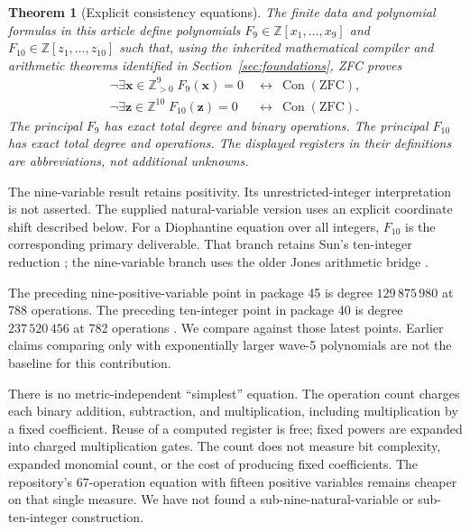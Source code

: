 \documentclass[11pt]{article}
\newcommand{\Z}{\mathbb Z}
\newcommand{\Pos}{\mathbb Z_{>0}}
\newcommand{\Con}{\operatorname{Con}}
\newtheorem{theorem}{Theorem}[section]
\theoremstyle{definition}\newtheorem{definition}[theorem]{Definition}
\theoremstyle{remark}\newtheorem{remark}[theorem]{Remark}
\begin{document}
\begin{theorem}[Explicit consistency equations]
The finite data and polynomial formulas in this article define polynomials
$F_9\in\Z[x_1,\ldots,x_9]$ and $F_{10}\in\Z[z_1,\ldots,z_{10}]$ such that,
using the inherited mathematical compiler and arithmetic theorems identified
in Section~\ref{sec:foundations}, ZFC proves
\begin{align*}
 \neg\exists\mathbf x\in\Pos^9\;F_9(\mathbf x)=0
 &\ \longleftrightarrow\ \Con(\mathrm{ZFC}),\\
 \neg\exists\mathbf z\in\Z^{10}\;F_{10}(\mathbf z)=0
 &\ \longleftrightarrow\ \Con(\mathrm{ZFC}).
\end{align*}
The principal $F_9$ has exact total degree \NineBestDegree{} and
\NineBestOps{} binary operations. The principal $F_{10}$ has exact total
degree \TenBestDegree{} and \TenBestOps{} operations. The displayed
registers in their definitions are abbreviations, not additional unknowns.
\end{theorem}



The nine-variable result retains positivity. Its unrestricted-integer
interpretation is not asserted. The supplied natural-variable version uses
an explicit coordinate shift described below. For a Diophantine equation
over all integers, $F_{10}$ is the corresponding primary deliverable.
That branch retains Sun's ten-integer reduction \cite{sun}; the
nine-variable branch uses the older Jones arithmetic bridge \cite{jones}.

The preceding nine-positive-variable point in package 45 is degree
$129\,875\,980$ at 788 operations. The preceding ten-integer point in
package 40 is degree $237\,520\,456$ at 782 operations
\cite{package40,package45}. We compare against those latest points. Earlier
claims comparing only with exponentially larger wave-5 polynomials are
not the baseline for this contribution.

There is no metric-independent ``simplest'' equation. The operation count
charges each binary addition, subtraction, and multiplication, including
multiplication by a fixed coefficient. Reuse of a computed register is free;
fixed powers are expanded into charged multiplication gates. The count does
not measure bit complexity, expanded monomial count, or the cost of producing
fixed coefficients. The repository's 67-operation equation with fifteen
positive variables remains cheaper on that single measure. We have not
found a sub-nine-natural-variable or sub-ten-integer construction.
\end{document}
